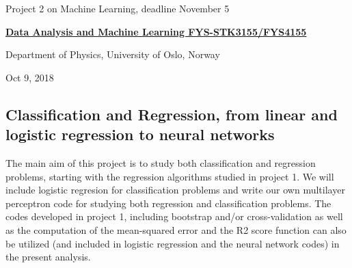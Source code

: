 \documentclass[%
oneside,                 %
final,                   %
10pt]{article}
\begin{document}

\newcommand{\exercisesection}[1]{\subsection*{#1}}






\thispagestyle{empty}

\begin{center}
{\LARGE\bf
\begin{spacing}{1.25}
Project 2 on Machine Learning, deadline November 5
\end{spacing}
}
\end{center}


\begin{center}
{\bf \href{{http://www.uio.no/studier/emner/matnat/fys/FYS3155/index-eng.html}}{Data Analysis and Machine Learning FYS-STK3155/FYS4155}}
\end{center}

    \begin{center}
\centerline{{\small Department of Physics, University of Oslo, Norway}}
\end{center}
    

\begin{center}
Oct 9, 2018
\end{center}

\vspace{1cm}


\subsection*{Classification and Regression, from linear and logistic regression to neural networks}

The main aim of this project is to study both classification and
regression problems, starting with the regression algorithms studied
in project 1. We will include logistic regresion for classification
problems and write our own multilayer perceptron code for studying
both regression and classification problems.  The codes developed in
project 1, including bootstrap and/or cross-validation as well as the
computation of the mean-squared error and the R2 score function can
also be utilized (and included in logistic regression and the neural
network codes) in the present analysis.
\end{document}
